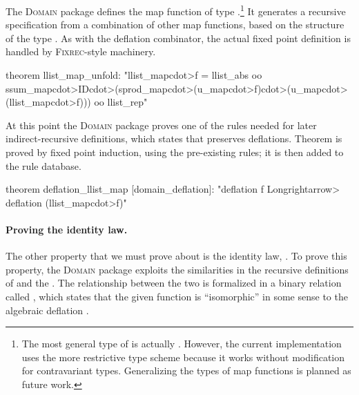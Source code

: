 The \textsc{Domain} package defines the map function  of type .\footnote{The most general type of  is actually . However, the current implementation uses the more restrictive type scheme because it works without modification for contravariant types. Generalizing the types of map functions is planned as future work.} It generates a recursive specification from a combination of other map functions, based on the structure of the type . As with the deflation combinator, the actual fixed point definition is handled by \textsc{Fixrec}-style machinery.
%
\begin{isacode}
theorem llist_map_unfold:
  "llist_map\<cdot>f = llist_abs oo
    ssum_map\<cdot>ID\<cdot>(sprod_map\<cdot>(u_map\<cdot>f)\<cdot>(u_map\<cdot>(llist_map\<cdot>f))) oo llist_rep"
\end{isacode}

At this point the \textsc{Domain} package proves one of the rules needed for later indirect-recursive definitions, which states that  preserves deflations. Theorem  is proved by fixed point induction, using the pre-existing  rules; it is then added to the  rule database.
%
\begin{isacode}
theorem deflation_llist_map [domain_deflation]:
  "deflation f \<Longrightarrow> deflation (llist_map\<cdot>f)"
\end{isacode}

\paragraph{Proving the identity law.}

The other property that we must prove about  is the identity law, . To prove this property, the \textsc{Domain} package exploits the similarities in the recursive definitions of  and the . The relationship between the two is formalized in a binary relation called , which states that the given function  is ``isomorphic'' in some sense to the algebraic deflation .


